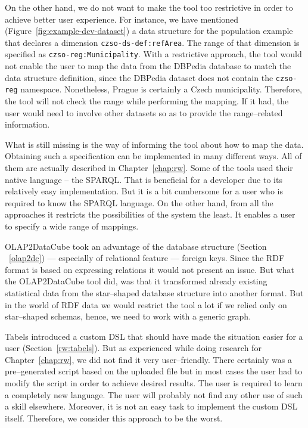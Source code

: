 \begin{sloppypar}
On the other hand, we do not want to make the tool too restrictive in order to 
achieve better user experience. For instance, we have mentioned
(Figure~\ref{fig:example-dcv-dataset}) a data structure 
for the population example that declares a dimension \texttt{czso-ds-def:refArea}. 
The range of that dimension is specified as \texttt{czso-reg:Municipality}. 
With a restrictive approach, the tool would not enable the user to map the data from 
the DBPedia database to match the data structure definition, since the DBPedia 
dataset does not contain the \texttt{czso-reg} namespace. Nonetheless, Prague is 
certainly a Czech municipality. Therefore, the tool will not check the range 
while performing the mapping. If it had, the user would need to involve 
other datasets so as to provide the range--related information.
\end{sloppypar}

What is still missing is the way of informing the tool about how to map the data.
Obtaining such a specification can be implemented in many different ways. 
All of them are actually described in Chapter~\ref{chap:rw}. Some of the tools used 
their native language -- the SPARQL. That is beneficial for a developer due to 
its relatively easy implementation. But it is a bit cumbersome for a user 
who is required to know the SPARQL language. On the other hand, from all the approaches
it restricts the possibilities of the system the least. It enables a user 
to specify a wide range of mappings.

OLAP2DataCube took an advantage of the database structure (Section ~\ref{olap2dc}) --- 
especially of relational feature --- foreign keys. Since the RDF format 
is based on expressing relations it would not present an issue. But what the 
OLAP2DataCube tool did, was that it transformed already existing statistical data from
the star--shaped database structure into another format. But in the world of RDF 
data we would restrict the tool a lot if we relied only on star--shaped 
schemas, hence, we need to work with a generic graph.

Tabels introduced a custom DSL that should have made the situation easier for 
a user (Section~\ref{rw:tabels}). But as experienced while doing research for Chapter~\ref{chap:rw}, 
we did not find it very user--friendly. There certainly was a pre--generated script based
on the uploaded file but in most cases the user had to modify the script in order to
achieve desired results. The user is required to learn a 
completely new language. The user will probably not find any other use of such a skill
elsewhere. Moreover, it is not an easy task to implement the 
custom DSL itself. Therefore, we consider this approach to be the worst.

